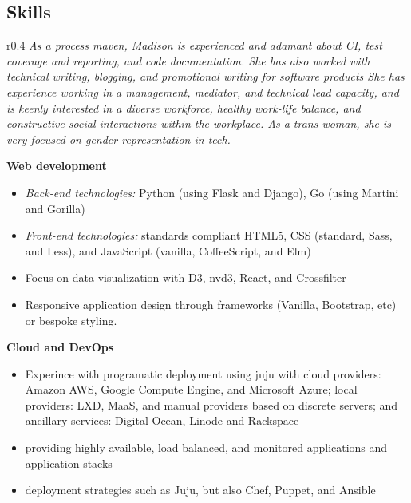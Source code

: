 \subsection{Skills}

\begin{wrapfigure}{r}{0.4\linewidth}
  \textit{\color{titlegreydark} \large As a process maven, Madison is experienced and adamant about CI, test coverage and reporting, and code documentation. She has also worked with technical writing, blogging, and promotional writing for software products She has experience working in a management, mediator, and technical lead capacity, and is keenly interested in a diverse workforce, healthy work-life balance, and constructive social interactions within the workplace. As a trans woman, she is very focused on gender representation in tech.}
  \vspace{-1in}
\end{wrapfigure}

\textbf{Web development}

\begin{itemize}
  \item \textit{Back-end technologies:} Python (using Flask and Django), Go (using Martini and Gorilla)
  \item \textit{Front-end technologies:} standards compliant HTML5, CSS (standard, Sass, and Less), and JavaScript (vanilla, CoffeeScript, and Elm)
  \item Focus on data visualization with D3, nvd3, React, and Crossfilter
  \item Responsive application design through frameworks (Vanilla, Bootstrap, etc) or bespoke styling.
\end{itemize}

\hspace{-1.5em}\textbf{Cloud and DevOps}

\begin{itemize}
  \item Experince with programatic deployment using juju with cloud providers: Amazon AWS, Google Compute Engine, and Microsoft Azure; local providers: LXD, MaaS, and manual providers based on discrete servers; and ancillary services: Digital Ocean, Linode and Rackspace
  \item providing highly available, load balanced, and monitored applications and application stacks
  \item deployment strategies such as Juju, but also Chef, Puppet, and Ansible
\end{itemize}

